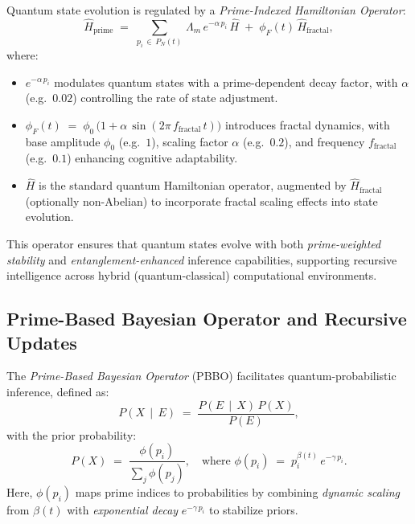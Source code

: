 \documentclass{article}
\theoremstyle{plain}
\theoremstyle{claimstyle}
\begin{document}
Quantum state evolution is regulated by a \emph{Prime-Indexed Hamiltonian Operator}:
\begin{equation}
\hat{H}_{\text{prime}} \;=\; \sum_{p_i \,\in\, P_N(t)}\,\Lambda_m\,e^{-\alpha\,p_i}\,\hat{H}
\;+\;
\phi_F(t)\,\hat{H}_{\text{fractal}},
\end{equation}
where:
\begin{itemize}
    \item $e^{-\alpha\,p_i}$ modulates quantum states with a prime-dependent decay factor, with $\alpha$ (e.g.\ $0.02$) controlling the rate of state adjustment.
    \item $\phi_F(t) \;=\; \phi_0\,\bigl(1 + \alpha\,\sin(2\pi\,f_{\text{fractal}}\,t)\bigr)$ introduces fractal dynamics, with base amplitude $\phi_0$ (e.g.\ $1$), scaling factor $\alpha$ (e.g.\ $0.2$), and frequency $f_{\text{fractal}}$ (e.g.\ $0.1$) enhancing cognitive adaptability.
    \item $\hat{H}$ is the standard quantum Hamiltonian operator, augmented by $\hat{H}_{\text{fractal}}$ (optionally non-Abelian) to incorporate fractal scaling effects into state evolution.
\end{itemize}

This operator ensures that quantum states evolve with both \emph{prime-weighted stability} and \emph{entanglement-enhanced} inference capabilities, supporting recursive intelligence across hybrid (quantum-classical) computational environments.

\subsection{Prime-Based Bayesian Operator and Recursive Updates}

The \emph{Prime-Based Bayesian Operator} (PBBO) facilitates quantum-probabilistic inference, defined as:
\begin{equation}
P(X \,\mid\, E)
\;=\;
\frac{P(E \,\mid\, X)\,P(X)}{P(E)},
\end{equation}
with the prior probability:
\begin{equation}
P(X)
\;=\;
\frac{\phi(p_i)}{\sum_j \phi(p_j)},
\quad
\text{where } \phi(p_i) \;=\; p_i^{\beta(t)}\,e^{-\gamma\,p_i}.
\end{equation}
Here, $\phi(p_i)$ maps prime indices to probabilities by combining \emph{dynamic scaling} from $\beta(t)$ with \emph{exponential decay} $e^{-\gamma\,p_i}$ to stabilize priors.
\end{document}
